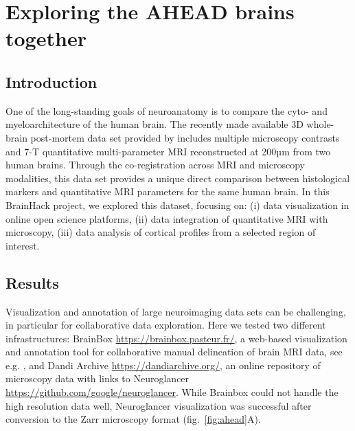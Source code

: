 \documentclass[../main.tex]{subfiles}
\begin{document}
\section{Exploring the AHEAD brains together}



\subsection{Introduction}
One of the long-standing goals of neuroanatomy is to compare the cyto- and myeloarchitecture of the human brain. The recently made available 3D whole-brain post-mortem data set provided by \textcite{Alkemade2022} includes multiple microscopy contrasts and 7-T quantitative multi-parameter MRI reconstructed at 200µm from two human brains. Through the co-registration across MRI and microscopy modalities, this data set provides a unique direct comparison between histological markers and quantitative MRI parameters for the same human brain. In this BrainHack project, we explored this dataset, focusing on: (i) data visualization in online open science platforms, (ii) data integration of quantitative MRI with microscopy, (iii) data analysis of cortical profiles from a selected region of interest. 


\subsection{Results}

Visualization and annotation of large neuroimaging data sets can be challenging, in particular for collaborative data exploration. Here we tested two different infrastructures: BrainBox \url{https://brainbox.pasteur.fr/}, a web-based visualization and annotation tool for collaborative manual delineation of brain MRI data, see e.g. \parencite{heuer_evolution_2019}, and Dandi Archive \url{https://dandiarchive.org/}, an online repository of microscopy data with links to Neuroglancer \url{https://github.com/google/neuroglancer}. While Brainbox could not handle the high resolution data well, Neuroglancer visualization was successful after conversion to the Zarr microscopy format (fig.~\ref{fig:ahead}A).
\end{document}
